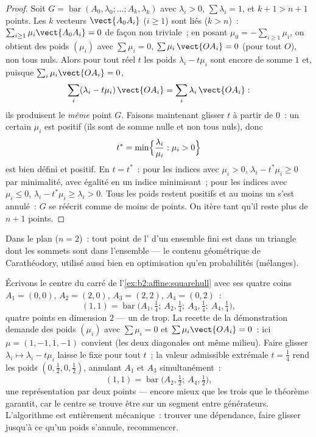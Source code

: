 \begin{proof}
Soit $G = \operatorname{bar}(A_0, \lambda_0; \dots; A_k, \lambda_k)$
avec $\lambda_i > 0$, $\sum\lambda_i = 1$, et $k + 1 > n + 1$
points. Les $k$ vecteurs $\vect{A_0A_i}$ ($i \geq 1$) sont liés
($k > n$)~: $\sum_{i\geq1}\mu_i \vect{A_0A_i} = 0$ de façon non
triviale~; en posant $\mu_0 = -\sum_{i\geq1}\mu_i$, on obtient des
poids $(\mu_i)$ avec $\sum\mu_i = 0$, $\sum \mu_i\,\vect{OA_i} = 0$
(pour tout $O$), non tous nuls. Alors pour tout réel $t$ les poids
$\lambda_i - t\mu_i$ sont encore de somme $1$ et, puisque
$\sum_i\mu_i\vect{OA_i} = 0$,
\[
\sum_i(\lambda_i - t\mu_i)\,\vect{OA_i}
= \sum_i\lambda_i\,\vect{OA_i} :
\]
ils produisent le \emph{même} point $G$. Faisons maintenant glisser
$t$ à partir de $0$~: un certain $\mu_i$ est positif (ils sont de
somme nulle et non tous nuls), donc
\[
t^* = \min\Bigl\{\frac{\lambda_i}{\mu_i} : \mu_i > 0\Bigr\}
\]
est bien défini et positif. En $t = t^*$~: pour les indices avec
$\mu_i > 0$, $\lambda_i - t^*\mu_i \geq 0$ par minimalité,
avec égalité en un indice minimisant~; pour les indices avec $\mu_i
\leq 0$, $\lambda_i - t^*\mu_i \geq \lambda_i > 0$. Tous
les poids restent positifs et au moins un s'est annulé~: $G$ se
réécrit comme  de moins de points. On itère tant qu'il
reste plus de $n + 1$ points.
\end{proof}

\begin{example}
Dans le plan ($n = 2$)~: tout point de l' d'un ensemble
fini est dans un triangle dont les sommets sont dans l'ensemble --- le
contenu géométrique de Carathéodory, utilisé aussi bien en
optimisation qu'en probabilités (mélanges).
\end{example}

\begin{example}\label{ex:b2:affine:caratheodoryrun}
Écrivons le centre du carré de
l'\cref{ex:b2:affine:squarehull} avec ses quatre coins $A_1 =
(0,0)$, $A_2 = (2,0)$, $A_3 = (2,2)$, $A_4 = (0,2)$~:
\[
(1,1) = \operatorname{bar}\bigl(A_1, \tfrac14;\ A_2,
\tfrac14;\ A_3, \tfrac14;\ A_4, \tfrac14\bigr),
\]
quatre points en dimension $2$ --- un de trop. La recette de la
démonstration demande des poids $(\mu_i)$ avec $\sum\mu_i = 0$ et
$\sum\mu_i\vect{OA_i} = 0$~: ici $\mu = (1, -1, 1, -1)$ convient
(les deux diagonales ont même milieu). Faire glisser $\lambda_i
\mapsto \lambda_i - t\mu_i$ laisse le  fixe pour
tout $t$~; la valeur admissible extrémale $t = \frac14$ rend
les poids $(0, \tfrac12, 0, \tfrac12)$, annulant $A_1$ et
$A_3$ simultanément~:
\[
(1,1) = \operatorname{bar}\bigl(A_2, \tfrac12;\ A_4,
\tfrac12\bigr),
\]
une représentation par deux points --- encore mieux que les trois
que le théorème garantit, car le centre se trouve être
sur un segment entre générateurs. L'algorithme est
entièrement mécanique~: trouver une dépendance, faire glisser
jusqu'à ce qu'un poids s'annule, recommencer.
\end{example}

